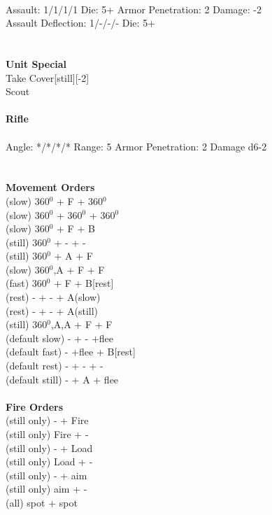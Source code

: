 \ \\
Assault: 1/1/1/1 Die: 5+ Armor Penetration: 2 Damage: -2 \\
Assault Deflection: 1/-/-/- Die: 5+\\
\indent  \\
\ \\

{\bf Unit Special} \\
Take Cover[still][-2] \\ Scout
\ \\
\ \\
{\bf Rifle } \\
\ \\
Angle: */*/*/* Range: 5 Armor Penetration: 2 Damage d6-2 \\
\indent  \\





\ \\ {\bf Movement Orders } \\
(slow) 360$^0$ + F + 360$^0$ \\
(slow) 360$^0$ + 360$^0$ + 360$^0$ \\
(slow) 360$^0$ + F + B  \\
(still) 360$^0$ + - + - \\
(still) 360$^0$ + A + F \\
(slow) 360$^0$,A + F + F \\
(fast) 360$^0$ + F + B[rest] \\
(rest) - + - + A(slow) \\
(rest) - + - + A(still) \\
(still) 360$^0$,A,A + F + F \\
(default slow) - + - +flee \\
(default fast) - +flee + B[rest] \\
(default rest) - + - + - \\
(default still) - + A + flee \\
\ \\ {\bf Fire Orders } \\
(still only) - + Fire \\
(still only) Fire + -  \\
(still only) - + Load \\
(still only) Load + - \\
(still only) - + aim \\
(still only) aim + -  \\
(all) spot + spot \\



